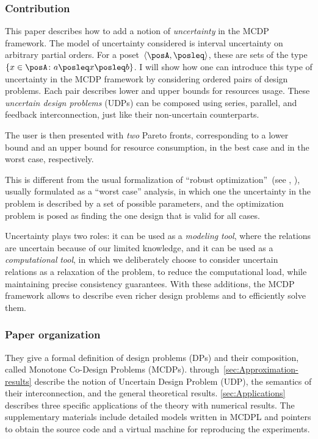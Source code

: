 \subsubsection*{Contribution}

This paper describes how to add a notion of \emph{uncertainty} in
the MCDP framework.
The model of uncertainty considered is interval
uncertainty on arbitrary partial orders.
For a poset~$\left\langle \posA,\posleq\right\rangle $,
these are sets of the type~$\{x\in\posA\colon a\posleq x\posleq b\}$.
I will show how one can introduce this type of uncertainty in the
MCDP framework by considering ordered pairs of design problems.
Each
pair describes lower and upper bounds for resources usage.
These \emph{uncertain
design problems} (UDPs) can be composed using series, parallel, and
feedback interconnection, just like their non-uncertain counterparts.

The user is then presented with \emph{two} Pareto fronts, corresponding
to a lower bound and an upper bound for resource consumption, in the
best case and in the worst case, respectively.

This is different from the usual formalization of ``robust optimization''~(see
\eg , \cite{bertsimas11theory,ben-tal09}), usually formulated as
a ``worst case'' analysis, in which one the uncertainty in the problem
is described by a set of possible parameters, and the optimization
problem is posed as finding the one design that is valid for all cases.

Uncertainty plays two roles: it can be used as a \emph{modeling} \emph{tool},
where the relations are uncertain because of our limited knowledge,
and it can be used as a \emph{computational} \emph{tool}, in which
we deliberately choose to consider uncertain relations as a relaxation
of the problem, to reduce the computational load, while maintaining
precise consistency guarantees. With these additions, the MCDP framework
allows to describe even richer design problems and to efficiently
solve them.


\subsubsection*{Paper organization}


They give a formal definition of design problems
(DPs) and their composition, called Monotone Co-Design Problems (MCDPs).
 through~\cref{sec:Approximation-results}
describe the notion of Uncertain Design Problem (UDP), the semantics
of their interconnection, and the general theoretical results. \cref{sec:Applications}
describes three specific applications of the theory with numerical
results. The supplementary materials include detailed models written
in MCDPL and pointers to obtain the source code and a virtual machine
for reproducing the experiments.



